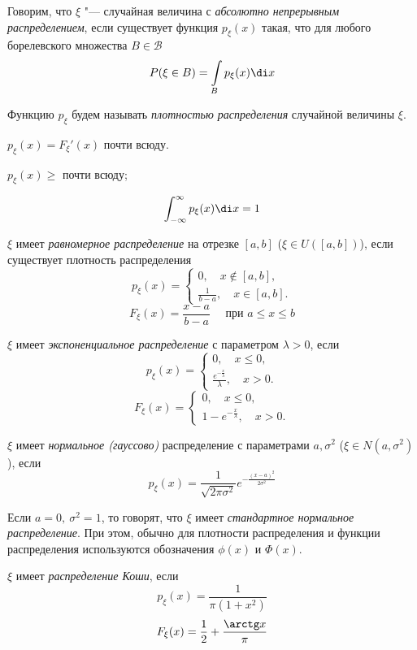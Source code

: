 \begin{definition}
	Говорим, что $ \xi $ "--- случайная величина с \emph{абсолютно непрерывным распределением}, если
	существует функция $ p_\xi(x) $ такая, что для любого борелевского множества
	$ B \in \mathcal B $
	$$ P( \xi \in B) = \int\limits_B p_\xi(x) \di x $$

	Функцию $ p_\xi $ будем называть \emph{плотностью распределения} случайной величины $ \xi $.
\end{definition}

\begin{remark}
	$ p_\xi(x) = F_\xi'(x) $ почти всюду.
\end{remark}

\begin{props}
\item $ p_\xi(x) \ge $ почти всюду;
\item
	$$ \int_{-\infty}^\infty p_\xi(x) \di x = 1 $$
\end{props}

\begin{exmpls}
\item $ \xi $ имеет \emph{равномерное распределение} на отрезке $ [a, b] $ ($ \xi \in U([a, b]) $),
	если существует плотность распределения
	$$ p_\xi(x) =
	\begin{cases}
		0, \quad x \notin [a, b], \\
		\frac1{b - a}, \quad x \in [a, b].
	\end{cases} $$
	$$ F_\xi(x) = \frac{x - a}{b - a} \quad \text{ при } a \le x \le b $$
\item $ \xi $ имеет \emph{экспоненциальное распределение} с параметром $ \lambda > 0 $, если
	$$ p_\xi(x) =
	\begin{cases}
		0, \quad x \le 0, \\
		\frac{e^{-\frac x \lambda}}\lambda, \quad x > 0.
	\end{cases} $$
	$$ F_\xi(x) =
	\begin{cases}
		0, \quad x \le 0, \\
		1 - e^{-\frac x \lambda}, \quad x > 0.
	\end{cases} $$
\item $ \xi $ имеет \emph{нормальное (гауссово)} распределение с параметрами $ a, \sigma^2 $ ($ \xi
	\in N(a, \sigma^2) $), если
	$$ p_\xi(x) = \frac1{\sqrt{2\pi \sigma^2}}e^{-\frac{(x - a)^2}{2\sigma^2}} $$

	Если $ a = 0, ~ \sigma^2 = 1 $, то говорят, что $ \xi $ имеет \emph{стандартное нормальное
	распределение}.
	При этом, обычно для плотности распределения и функции распределения используются обозначения
	$ \phi(x) $ и $ \Phi(x) $.
\item $ \xi $ имеет \emph{распределение Коши}, если
	$$ p_\xi(x) = \frac1{\pi(1 + x^2)} $$
	$$ F_\xi(x) = \frac12 + \frac{\arctg x}\pi $$
\end{exmpls}

